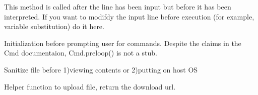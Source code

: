 \documentclass[letterpaper,10pt,english]{sphinxmanual}
\begin{document}
\begin{fulllineitems}
\begin{fulllineitems}
\label{main:main.Console.precmd}
This method is called after the line has been input but before
it has been interpreted. If you want to modifdy the input line
before execution (for example, variable substitution) do it here.

\end{fulllineitems}


\begin{fulllineitems}
\label{main:main.Console.preloop}
Initialization before prompting user for commands.
Despite the claims in the Cmd documentaion,
Cmd.preloop() is not a stub.

\end{fulllineitems}


\begin{fulllineitems}
\label{main:main.Console.san_file}
Sanitize file before 1)viewing contents or 2)putting on host OS

\end{fulllineitems}


\begin{fulllineitems}
\label{main:main.Console.upload_file}
Helper function to upload file, return the download url.

\end{fulllineitems}


\end{fulllineitems}


\begin{fulllineitems}
\label{main:main.proxy_parser}
\end{fulllineitems}


\begin{fulllineitems}
\label{main:main.proxy_test}
\end{fulllineitems}
\end{document}
